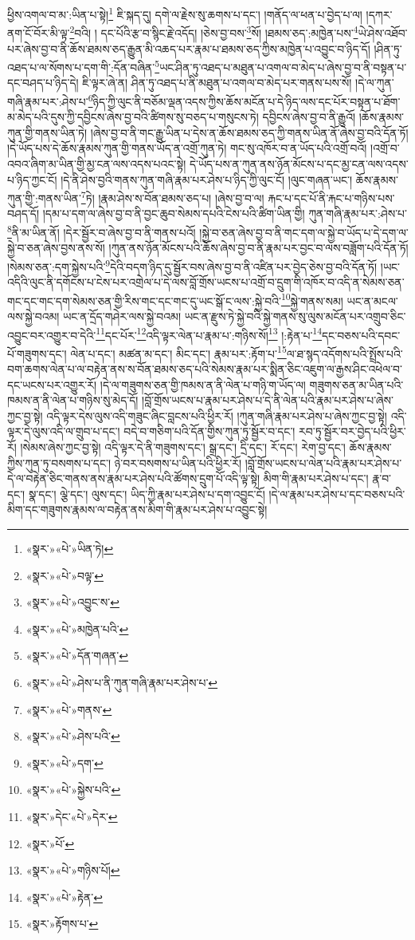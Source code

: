 ཕྱིས་འགལ་བ་མ་:ཡིན་པ་སྟེ།\footnote{«སྣར་»«པེ་»ཡིན་ཏེ།} ཇི་སྐད་དུ། དགེ་ལ་རྗེས་སུ་ཆགས་པ་དང་། །གནོད་ལ་ཕན་པ་བྱེད་པ་ལ། །དཀར་ནག་ངོ་བོར་མི་ལྟ་\footnote{«སྣར་»«པེ་»བལྟ་}བའི། །
དང་པོའི་རྩ་བ་སྙིང་རྗེ་འདོད། །ཅེས་བྱ་བས་\footnote{«སྣར་»«པེ་»འབྱུང་ས་}སོ། །ཐམས་ཅད་:མཁྱེན་པས་\footnote{«སྣར་»«པེ་»མཁྱེན་པའི་}ཡེ་ཤེས་འཐོབ་པར་ཞེས་བྱ་བ་ནི་ཆོས་ཐམས་ཅད་རྒྱུན་མི་འཆད་པར་རྣམ་པ་ཐམས་ཅད་ཀྱིས་མཁྱེན་པ་འབྱུང་བ་ཉིད་དོ། །ཤིན་ཏུ་འཐད་པ་ལ་སོགས་པ་དག་གི་:དོན་བཞིན་\footnote{«སྣར་»«པེ་»དོན་གཞན་}ཡང་ཤིན་ཏུ་འཐད་པ་མཐུན་པ་འགལ་བ་མེད་པ་ཞེས་བྱ་བ་ནི་བསྟན་པ་དང་བཤད་པ་ཉིད་དེ། ཇི་ལྟར་ཞེ་ན། ཤིན་ཏུ་འཐད་པ་ནི་མཐུན་པ་འགལ་བ་མེད་པར་གནས་པས་སོ། །དེ་ལ་ཀུན་གཞི་རྣམ་པར་:ཤེས་པ་\footnote{«སྣར་»«པེ་»ཤེས་པ་ནི་ཀུན་གཞི་རྣམ་པར་ཤེས་པ་}ཉིད་ཀྱི་ལུང་ནི་བཅོམ་ལྡན་འདས་ཀྱིས་ཆོས་མངོན་པ་དེ་ཉིད་ལས་དང་པོར་བསྟན་པ་ཐོག་མ་མེད་པའི་དུས་ཀྱི་དབྱིངས་ཞེས་བྱ་བའི་ཚིགས་སུ་བཅད་པ་གསུངས་ཏེ། དབྱིངས་ཞེས་བྱ་བ་ནི་རྒྱུའོ། །ཆོས་རྣམས་ཀུན་གྱི་གནས་ཡིན་ཏེ། །ཞེས་བྱ་བ་ནི་གང་རྒྱུ་ཡིན་པ་དེས་ན་ཆོས་ཐམས་ཅད་ཀྱི་གནས་ཡིན་ནོ་ཞེས་བྱ་བའི་དོན་ཏོ། །དེ་ཡོད་པས་དེ་ཆོས་རྣམས་ཀུན་གྱི་གནས་ཡོད་ན་འགྲོ་ཀུན་ཏེ། གང་སུ་འཁོར་བ་ན་ཡོད་པའི་འགྲོ་བའོ། །འགྲོ་བ་འབའ་ཞིག་མ་ཡིན་གྱི་མྱ་ངན་ལས་འདས་པའང་སྟེ། དེ་ཡོད་པས་ན་ཀུན་ནས་ཉོན་མོངས་པ་དང་མྱ་ངན་ལས་འདས་པ་ཉིད་ཀྱང་ངོ། །དེ་ནི་ཤེས་བྱའི་གནས་ཀུན་གཞི་རྣམ་པར་ཤེས་པ་ཉིད་ཀྱི་ལུང་ངོ། །ལུང་གཞན་ཡང་། ཆོས་རྣམས་ཀུན་གྱི་:གནས་ཡིན་\footnote{«སྣར་»«པེ་»གནས་}ཏེ། །རྣམ་ཤེས་ས་བོན་ཐམས་ཅད་པ། །ཞེས་བྱ་བ་ལ། རྐང་པ་དང་པོ་ནི་རྐང་པ་གཉིས་པས་བཤད་དོ། །དམ་པ་དག་ལ་ཞེས་བྱ་བ་ནི་བྱང་ཆུབ་སེམས་དཔའི་ངེས་པའི་ཚིག་ཡིན་གྱི། ཀུན་གཞི་རྣམ་པར་:ཤེས་པ་\footnote{«སྣར་»«པེ་»ཤེས་པའི་}ནི་མ་ཡིན་ནོ། །དེར་སྦྱོར་བ་ཞེས་བྱ་བ་ནི་གནས་པའོ། །སྐྱེ་བ་ཅན་ཞེས་བྱ་བ་ནི་གང་དག་ལ་སྐྱེ་བ་ཡོད་པ་དེ་དག་ལ་སྐྱེ་བ་ཅན་ཞེས་བྱས་ནས་སོ། །ཀུན་ནས་ཉོན་མོངས་པའི་ཆོས་ཞེས་བྱ་བ་ནི་རྣམ་པར་བྱང་བ་ལས་བཟློག་པའི་དོན་ཏོ། །སེམས་ཅན་:དག་སྐྱེས་པའི་\footnote{«སྣར་»«པེ་»དག་}དེའི་བདག་ཉིད་དུ་སྦྱོར་བས་ཞེས་བྱ་བ་ནི་འཛིན་པར་བྱེད་ཅེས་བྱ་བའི་དོན་ཏོ། །ཡང་འདིའི་ལུང་ནི་དགོངས་པ་ངེས་པར་འགྲེལ་པ་དེ་ལས་བློ་གྲོས་ཡངས་པ་འགྲོ་བ་དྲུག་གི་འཁོར་བ་འདི་ན་སེམས་ཅན་གང་དང་གང་དག་སེམས་ཅན་གྱི་རིས་གང་དང་གང་དུ་ཡང་སྒོ་ང་ལས་:སྐྱེ་བའི་\footnote{«སྣར་»«པེ་»སྐྱེས་པའི་}སྐྱེ་གནས་སམ། ཡང་ན་མངལ་ལས་སྐྱེ་བའམ། ཡང་ན་དྲོད་གཤེར་ལས་སྐྱེ་བའམ། ཡང་ན་རྫུས་ཏེ་སྐྱེ་བའི་སྐྱེ་གནས་སུ་ལུས་མངོན་པར་འགྲུབ་ཅིང་འབྱུང་བར་འགྱུར་བ་དེའི་\footnote{«སྣར་»དེང་«པེ་»དེར་}དང་པོར་\footnote{«སྣར་»པོ་}འདི་ལྟར་ལེན་པ་རྣམ་པ་:གཉིས་སོ།\footnote{«སྣར་»«པེ་»གཉིས་པོ།} །:རྟེན་པ་\footnote{«སྣར་»«པེ་»རྟེན་}དང་བཅས་པའི་དབང་པོ་གཟུགས་དང་། ལེན་པ་དང་། མཚན་མ་དང་། མིང་དང་། རྣམ་པར་:རྟོག་པ་\footnote{«སྣར་»རྟོགས་པ་}ལ་ཐ་སྙད་འདོགས་པའི་སྤྲོས་པའི་བག་ཆགས་ལེན་པ་ལ་བརྟེན་ནས་ས་བོན་ཐམས་ཅད་པའི་སེམས་རྣམ་པར་སྨིན་ཅིང་འཇུག་ལ་རྒྱས་ཤིང་འཕེལ་བ་དང་ཡངས་པར་འགྱུར་རོ། །དེ་ལ་གཟུགས་ཅན་གྱི་ཁམས་ན་ནི་ལེན་པ་གཉི་ག་ཡོད་ལ། གཟུགས་ཅན་མ་ཡིན་པའི་ཁམས་ན་ནི་ལེན་པ་གཉིས་སུ་མེད་དོ། །བློ་གྲོས་ཡངས་པ་རྣམ་པར་ཤེས་པ་དེ་ནི་ལེན་པའི་རྣམ་པར་ཤེས་པ་ཞེས་ཀྱང་བྱ་སྟེ། འདི་ལྟར་དེས་ལུས་འདི་གཟུང་ཞིང་བླངས་པའི་ཕྱིར་རོ། །ཀུན་གཞི་རྣམ་པར་ཤེས་པ་ཞེས་ཀྱང་བྱ་སྟེ། འདི་ལྟར་དེ་ལུས་འདི་ལ་གྲུབ་པ་དང་། བདེ་བ་གཅིག་པའི་དོན་གྱིས་ཀུན་ཏུ་སྦྱོར་བ་དང་། རབ་ཏུ་སྦྱོར་བར་བྱེད་པའི་ཕྱིར་རོ། །སེམས་ཞེས་ཀྱང་བྱ་སྟེ། འདི་ལྟར་དེ་ནི་གཟུགས་དང་། སྒྲ་དང་། དྲི་དང་། རོ་དང་། རེག་བྱ་དང་། ཆོས་རྣམས་ཀྱིས་ཀུན་ཏུ་བསགས་པ་དང་། ཉེ་བར་བསགས་པ་ཡིན་པའི་ཕྱིར་རོ། །བློ་གྲོས་ཡངས་པ་ལེན་པའི་རྣམ་པར་ཤེས་པ་དེ་ལ་བརྟེན་ཅིང་གནས་ནས་རྣམ་པར་ཤེས་པའི་ཚོགས་དྲུག་པོ་འདི་ལྟ་སྟེ། མིག་གི་རྣམ་པར་ཤེས་པ་དང་། རྣ་བ་དང་། སྣ་དང་། ལྕེ་དང་། ལུས་དང་། ཡིད་ཀྱི་རྣམ་པར་ཤེས་པ་དག་འབྱུང་ངོ། །དེ་ལ་རྣམ་པར་ཤེས་པ་དང་བཅས་པའི་མིག་དང་གཟུགས་རྣམས་ལ་བརྟེན་ནས་མིག་གི་རྣམ་པར་ཤེས་པ་འབྱུང་སྟེ། 